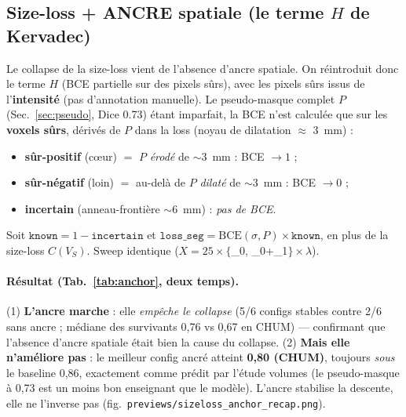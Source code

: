 \documentclass[11pt,a4paper]{article}
\begin{document}
\subsection{Size-loss + ANCRE spatiale (le terme $H$ de Kervadec)}
\label{sec:anchor}
Le collapse de la size-loss vient de l'absence d'ancre spatiale. On réintroduit donc le
terme $H$ (BCE partielle sur des pixels sûrs), avec les pixels sûrs issus de l'\textbf{intensité}
(pas d'annotation manuelle). Le pseudo-masque complet $P$ (Sec.~\ref{sec:pseudo}, Dice 0.73)
étant imparfait, la BCE n'est calculée que sur les \textbf{voxels sûrs}, dérivés de $P$ dans
la loss (noyau de dilatation $\approx$ 3~mm) :
\begin{itemize}[nosep]
  \item \textbf{sûr-positif} (c\oe ur) $=$ $P$ \emph{érodé} de $\sim$3~mm : BCE $\to 1$ ;
  \item \textbf{sûr-négatif} (loin) $=$ au-delà de $P$ \emph{dilaté} de $\sim$3~mm : BCE $\to 0$ ;
  \item \textbf{incertain} (anneau-frontière $\sim$6~mm) : \emph{pas de BCE}.
\end{itemize}
Soit $\texttt{known} = 1 - \texttt{incertain}$ et $\texttt{loss\_seg} = \mathrm{BCE}(\sigma, P)
\times \texttt{known}$, en plus de la size-loss $C(V_S)$. Sweep identique
($X{=}25 \times \{$\_0, \_0+\_1$\} \times \lambda$).

\paragraph{Résultat (Tab.~\ref{tab:anchor}, deux temps).}
(1) \textbf{L'ancre marche} : elle \emph{empêche le collapse} (5/6 configs stables contre 2/6
sans ancre ; médiane des survivants 0,76 vs 0,67 en CHUM) --- confirmant que l'absence
d'ancre spatiale était bien la cause du collapse. (2) \textbf{Mais elle n'améliore pas} :
le meilleur config ancré atteint \textbf{0,80 (CHUM)}, toujours \emph{sous} le baseline 0,86,
exactement comme prédit par l'étude volumes (le pseudo-masque à 0,73 est un moins bon
enseignant que le modèle). L'ancre stabilise la descente, elle ne l'inverse pas
(fig.\ \texttt{previews/sizeloss\_anchor\_recap.png}).
\end{document}

